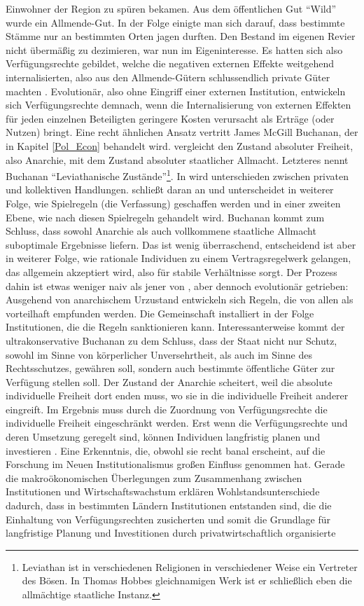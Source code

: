 Einwohner der Region zu spüren bekamen. Aus dem öffentlichen Gut "`Wild"' wurde ein Allmende-Gut. In der Folge einigte man sich darauf, dass bestimmte Stämme nur an bestimmten Orten jagen durften. Den Bestand im eigenen Revier nicht übermäßig zu dezimieren, war nun im Eigeninteresse. Es hatten sich also Verfügungsrechte gebildet, welche die negativen externen Effekte weitgehend internalisierten, also aus den Allmende-Gütern schlussendlich private Güter machten \parencite{Demsetz1967}. Evolutionär, also ohne Eingriff einer externen Institution, entwickeln sich Verfügungsrechte demnach, wenn die Internalisierung von externen Effekten für jeden einzelnen Beteiligten geringere Kosten verursacht als Erträge (oder Nutzen) bringt. Eine recht ähnlichen Ansatz vertritt James McGill Buchanan, der in Kapitel \ref{Pol_Econ} behandelt wird. \textcite{Buchanan1975} vergleicht den Zustand absoluter Freiheit, also Anarchie, mit dem Zustand absoluter staatlicher Allmacht. Letzteres nennt Buchanan "`Leviathanische Zustände"'\footnote{Leviathan ist in verschiedenen Religionen in verschiedener Weise ein Vertreter des Bösen. In Thomas Hobbes gleichnamigen Werk ist er schließlich eben die allmächtige staatliche Instanz.}. In \textcite{Hobbes1651} wird unterschieden zwischen privaten und kollektiven Handlungen. \textcite{Buchanan1975} schließt daran an und unterscheidet in weiterer Folge, wie Spielregeln (die Verfassung) geschaffen werden und in einer zweiten Ebene, wie nach diesen Spielregeln gehandelt wird. Buchanan kommt zum Schluss, dass sowohl Anarchie als auch vollkommene staatliche Allmacht suboptimale Ergebnisse liefern. Das ist wenig überraschend, entscheidend ist aber in weiterer Folge, wie rationale Individuen zu einem Vertragsregelwerk gelangen, das allgemein akzeptiert wird, also für stabile Verhältnisse sorgt. Der Prozess dahin ist etwas weniger naiv als jener von \textcite{Demsetz1967}, aber dennoch evolutionär getrieben: Ausgehend von anarchischem Urzustand entwickeln sich Regeln, die von allen als vorteilhaft empfunden werden. Die Gemeinschaft installiert in der Folge Institutionen, die die Regeln sanktionieren kann. Interessanterweise kommt der ultrakonservative Buchanan zu dem Schluss, dass der Staat nicht nur Schutz, sowohl im Sinne von körperlicher Unversehrtheit, als auch im Sinne des Rechtsschutzes, gewähren soll, sondern auch bestimmte öffentliche Güter zur Verfügung stellen soll. Der Zustand der Anarchie scheitert, weil die absolute individuelle Freiheit dort enden muss, wo sie in die individuelle Freiheit anderer eingreift. Im Ergebnis muss durch die Zuordnung von Verfügungsrechte die individuelle Freiheit eingeschränkt werden. Erst wenn die Verfügungsrechte und deren Umsetzung geregelt sind, können Individuen langfristig planen und investieren \parencite[S. 285]{Erlei2016}. Eine Erkenntnis, die, obwohl sie recht banal erscheint, auf die Forschung im Neuen Institutionalismus großen Einfluss genommen hat. Gerade die makroökonomischen Überlegungen zum Zusammenhang zwischen Institutionen und Wirtschaftswachstum erklären Wohlstandsunterschiede dadurch, dass in bestimmten Ländern Institutionen entstanden sind, die die Einhaltung von Verfügungsrechten zusicherten und somit die Grundlage für langfristige Planung und Investitionen durch privatwirtschaftlich organisierte 